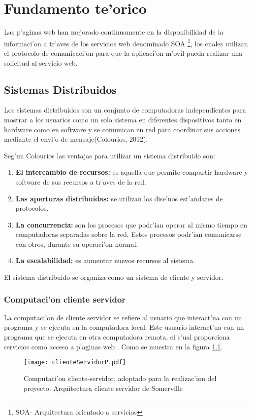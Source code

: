 \chapter{Fundamento te'orico}
\label{capitulodos}
Las p'aginas web han mejorado continuamente en la disponibilidad de la informaci'on a tr'aves de los servicios web denominado SOA \footnote{SOA- Arquitectura orientado a servicios}, los cuales  utilizan el protocolo de comunicaci'on para que la aplicaci'on m'ovil pueda realizar una solicitud al servicio web.

\section{Sistemas Distribuidos}

Los sistemas distribuidos son un conjunto de computadoras independientes para mostrar a los usuarios como un solo sistema en diferentes dispositivos tanto en hardware como en software y se comunican en red para coordinar sus acciones mediante el envi'o de mensaje(Colourios, 2012).\cite{Colourios2012}

Seg'un Colourios las ventajas para utilizar un sistema distribuido son:
\begin{enumerate}
\item \textbf{El intercambio de recursos:} es aquella que permite compartir hardware y software de sus recursos a tr'aves de la red.

\item \textbf{Las aperturas distribuidas:} se utilizan los dise'nos est'andares de protocolos.

\item \textbf{La concurrencia:} son los  procesos que podr'ian operar al mismo tiempo en computadoras separadas sobre la red. Estos procesos podr'ian comunicarse con otros, durante su operaci'on normal.

\item \textbf{La escalabilidad:} es aumentar nuevos recursos al sistema.
\end{enumerate}

El sistema distribuido se organiza como un sistema de cliente y servidor.

\subsection{Computaci'on cliente servidor}
La computaci'on de cliente servidor se refiere al usuario que interact'ua con un programa y se ejecuta en la computadora local. Este usuario interact'ua con un programa que se ejecuta en otra  computadora remota, el c'ual proporciona servicios como acceso a p'aginas web \cite{Somerville2011}. Como se muestra en la figura \ref{fig:clienteServidor}. 
\begin{figure}[H]
\centering
\texttt{[image: clienteServidorP.pdf]}
\captionsetup{justification=centering,margin=2cm}
\caption{Computaci'on cliente-servidor, adoptado para la realizac'ion del proyecto. Arquitectura cliente servidor de Somerville\cite{Somerville2011}}
\label{fig:clienteServidor}
\end{figure}

